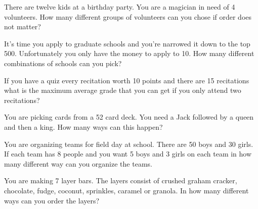 \begin{problem}
\begin{subproblem}
      \vfill

      \clearpage

    \item There are twelve kids at a birthday party. You are a
      magician in need of 4 volunteers. How many different groups of
      volunteers can you chose if order does not matter?

      \vfill

    \item It's time you apply to graduate schools and you're narrowed
      it down to the top 500. Unfortunately you only have the money to
      apply to 10. How many different combinations of schools can you
      pick?

      \vfill

    \item If you have a quiz every recitation worth 10 points and
      there are 15 recitations what is the maximum average grade that
      you can get if you only attend two recitations?

      \vfill

      \clearpage

    \item You are picking cards from a 52 card deck. You need a Jack
      followed by a queen and then a king. How many ways can this
      happen?

      \vfill

    \item You are organizing teams for field day at school. There are
      50 boys and 30 girls. If each team has 8 people and you want 5
      boys and 3 girls on each team in how many different way can you
      organize the teams.

      \vfill

    \item You are making 7 layer bars. The layers consist of crushed
      graham cracker, chocolate, fudge, coconut, sprinkles, caramel or
      granola. In how many different ways can you order the layers?

      \vfill

  \end{subproblem}

\end{problem}



